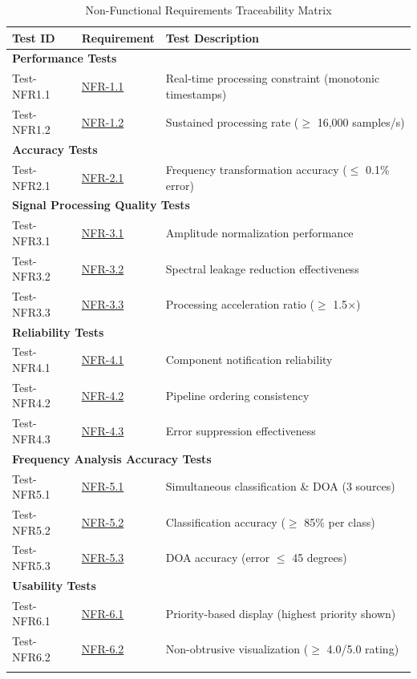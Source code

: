 \documentclass[12pt, titlepage]{article}
\begin{document}
{\small
\begin{longtable}{|p{2.5cm}|p{3cm}|p{8cm}|}
\hline
\textbf{Test ID} & \textbf{Requirement} & \textbf{Test Description} \\
\hline
\hline
\multicolumn{3}{|l|}{\textbf{Performance Tests}} \\
\hline
Test-NFR1.1 & \hyperref[SRS-NFR1_1]{NFR-1.1} & Real-time processing constraint
(monotonic timestamps) \\
\hline
Test-NFR1.2 & \hyperref[SRS-NFR1_2]{NFR-1.2} & Sustained processing rate ($\geq$
16,000 samples/s) \\
\hline
\hline
\multicolumn{3}{|l|}{\textbf{Accuracy Tests}} \\
\hline
Test-NFR2.1 & \hyperref[SRS-NFR2_1]{NFR-2.1} & Frequency transformation accuracy
($\leq$ 0.1\% error) \\
\hline
\hline
\multicolumn{3}{|l|}{\textbf{Signal Processing Quality Tests}} \\
\hline
Test-NFR3.1 & \hyperref[SRS-NFR3_1]{NFR-3.1} & Amplitude normalization
performance \\
\hline
Test-NFR3.2 & \hyperref[SRS-NFR3_2]{NFR-3.2} & Spectral leakage reduction
effectiveness \\
\hline
Test-NFR3.3 & \hyperref[SRS-NFR3_3]{NFR-3.3} & Processing acceleration ratio
($\geq$ 1.5$\times$) \\
\hline
\hline
\multicolumn{3}{|l|}{\textbf{Reliability Tests}} \\
\hline
Test-NFR4.1 & \hyperref[SRS-NFR4_1]{NFR-4.1} & Component notification
reliability \\
\hline
Test-NFR4.2 & \hyperref[SRS-NFR4_2]{NFR-4.2} & Pipeline ordering consistency \\
\hline
Test-NFR4.3 & \hyperref[SRS-NFR4_3]{NFR-4.3} & Error suppression effectiveness\\
\hline
\hline
\multicolumn{3}{|l|}{\textbf{Frequency Analysis Accuracy Tests}} \\
\hline
Test-NFR5.1 & \hyperref[SRS-NFR5_1]{NFR-5.1} & Simultaneous classification \&
DOA (3 sources) \\
\hline
Test-NFR5.2 & \hyperref[SRS-NFR5_2]{NFR-5.2} & Classification accuracy ($\geq$
85\% per class) \\
\hline
Test-NFR5.3 & \hyperref[SRS-NFR5_3]{NFR-5.3} & DOA accuracy (error $\leq$ 45
degrees)\\
\hline
\hline
\multicolumn{3}{|l|}{\textbf{Usability Tests}} \\
\hline
Test-NFR6.1 & \hyperref[SRS-NFR6_1]{NFR-6.1} & Priority-based display (highest
priority shown) \\
\hline
Test-NFR6.2 & \hyperref[SRS-NFR6_2]{NFR-6.2} & Non-obtrusive visualization
($\geq$ 4.0/5.0 rating) \\
\hline
\caption{Non-Functional Requirements Traceability Matrix}
\label{TblNFRTrace}
\end{longtable}
}
\end{document}
